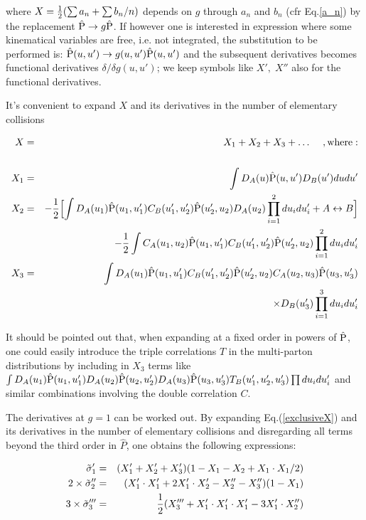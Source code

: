 \documentclass{ws-rv9x6}
\begin{document}
\noindent where $X={1\over2}(\sum a_n+\sum b_n/n)$ depends on $g$ through $a_n$ and $b_n$  (cfr Eq.\ref{a_n}) by the replacement $\hat{\rm P}\to g\hat{\rm P}$.
If however one is interested in expression where some kinematical variables are free, i.e. not integrated, the substitution to be performed is: 
$\hat{\rm P}(u,u')\to g(u,u')\hat{\rm P}(u,u')$ and the subsequent derivatives becomes functional derivatives $\delta/\delta g(u,u')$; we keep symbols like $X',\;X''$ also for the functional derivatives.

It's convenient to expand $X$ and its derivatives in the
number of elementary collisions

\begin{eqnarray}
X&=&X_1+X_2+X_3+\dots\,\,\,\,\,\,\,{\rm , where:}\nonumber\\
&&\nonumber\\
X_1&=&\int D_A(u)\hat{\rm P}(u,u') D_B(u')dudu'\nonumber\\
X_2&=&-{1\over2}\Bigl[\int D_A(u_1)\hat{\rm P}(u_1,u_1') C_B(u_1',u_2')
       \hat{\rm P}(u_2',u_2)D_A(u_2)\prod_{i=1}^2du_idu_i'+A\leftrightarrow B\Bigr]\nonumber\\
&&\qquad-{1\over2}\int C_A(u_1,u_2)\hat{\rm P}(u_1,u_1') C_B(u_1',u_2')
       \hat{\rm P}(u_2',u_2)\prod_{i=1}^2du_idu_i'\\
X_3&=&\int D_A(u_1)\hat{\rm P}(u_1,u_1') C_B(u_1',u_2')
       \hat{\rm P}(u_2',u_2)C_A(u_2,u_3)
       \hat{\rm P}(u_3,u_3')\nonumber\\
&&\qquad\times D_B(u_3')\prod_{i=1}^3du_idu_i'\nonumber
\end{eqnarray}

It should be pointed out that, when expanding at a fixed order in powers of $\hat{\rm P}$, one could easily introduce the triple correlations $T$ in the multi-parton distributions by including in $X_3$ terms like $\int D_A(u_1)\hat{\rm P}(u_1,u_1') D_A(u_2)\hat{\rm P}(u_2,u_2') D_A(u_3)\hat{\rm P}(u_3,u_3')T_B(u_1',u_2',u_3')\prod du_idu_i'$ and similar combinations involving the double correlation $C$\cite{Calucci:2009sv}. 

The derivatives at $g=1$ can be worked out\cite{Calucci:2009sv}. By expanding Eq.(\ref{exclusiveX}) and its derivatives in the number of
elementary collisions and disregarding all terms beyond the third order in $\hat P$, one obtains the following expressions:

\begin{eqnarray}
\tilde\sigma_1'&=&(X'_1+X'_2+X'_3)(1-X_1-X_2+X_1\cdot X_1/2)\nonumber\\
2\times\tilde\sigma_2''&=&(X'_1\cdot X'_1+2X'_1\cdot X'_2-X_2''-X_3'')(1-X_1)\\
3\times\tilde\sigma_3'''&=&{1\over2}(X'''_3+X_1'\cdot X_1'\cdot X_1'-3X_1'\cdot X_2'')\nonumber
\end{eqnarray}
\end{document}
